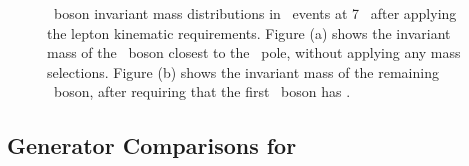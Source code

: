 \begin{figure}
\centering
        \vspace{-5mm}
        \vspace{-2mm}
    \caption[\Z\ boson invariant mass distributions in \ZZllll\ events at
    7 \tev\ after
    applying the lepton kinematic requirements.]{\small \Z\ boson invariant mass distributions in \ZZllll\ events at
    7 \tev\ after
    applying the lepton kinematic requirements. Figure (a) shows the invariant
    mass of the \Z\ boson closest to the \Z\ pole, without applying any mass
    selections. Figure (b) shows the invariant
    mass of the remaining \Z\ boson, after requiring that the first \Z\ boson
    has \sstooos. }
    \label{fig:gen-mZ}
\end{figure}

\subsection{Generator Comparisons for \ZZllll}

